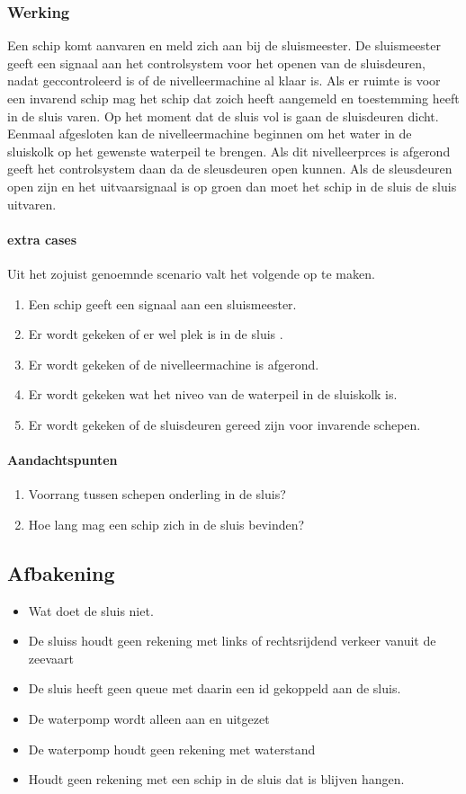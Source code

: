 {{{{{{{{{\subsubsection{Werking}

Een schip komt aanvaren en meld zich aan bij de sluismeester. De sluismeester geeft een signaal aan het controlsystem voor het openen van de sluisdeuren, nadat geccontroleerd is of de nivelleermachine al klaar is. Als er ruimte is voor een invarend schip mag het schip dat zoich heeft aangemeld en toestemming heeft  in de sluis varen. Op het moment dat de sluis vol is gaan de sluisdeuren dicht. Eenmaal afgesloten kan de nivelleermachine beginnen om het water in de sluiskolk op het gewenste waterpeil te brengen. Als dit nivelleerprces is afgerond geeft  het controlsystem daan da de sleusdeuren open kunnen.  Als de sleusdeuren open zijn en het uitvaarsignaal is op groen dan moet het schip in de sluis de sluis uitvaren.
\paragraph{extra cases}
Uit het zojuist genoemnde scenario valt het volgende op te maken.
\begin{enumerate}
	\item Een schip geeft een signaal aan een sluismeester.
	\item Er wordt gekeken of er wel plek is in de sluis .
	\item Er wordt gekeken of de nivelleermachine is afgerond.
	\item Er wordt gekeken wat het niveo van de waterpeil in de sluiskolk is.
	\item Er wordt gekeken of de sluisdeuren gereed zijn voor invarende schepen.
\end{enumerate}
\paragraph{Aandachtspunten}
\begin{enumerate}
	\item Voorrang tussen schepen onderling in de sluis?
	\item Hoe lang mag een schip zich in de sluis bevinden?
\end{enumerate} 




\subsection{Afbakening}
\begin{itemize}
	\item Wat doet de sluis niet.
	\item De sluiss houdt geen rekening met links of rechtsrijdend verkeer vanuit de zeevaart
	\item De sluis heeft geen queue met daarin een id gekoppeld aan de sluis.
	\item De waterpomp wordt alleen aan en uitgezet
	\item De waterpomp houdt geen rekening met waterstand
	\item Houdt geen rekening met een schip in de sluis dat is blijven hangen.
	

\end{itemize}}}}}}}}}}
